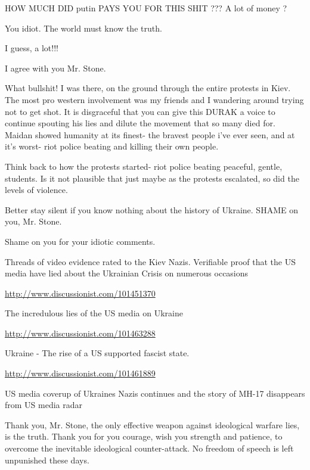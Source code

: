 \begin{itemize}

HOW MUCH DID putin PAYS YOU FOR THIS SHIT ??? A lot of money ?

\begin{itemize} %
You idiot. The world must know the truth.

I guess, a lot!!!
\end{itemize} %

I agree with you Mr. Stone.


What bullshit! I was there, on the ground through the entire protests in Kiev.
The most pro western involvement was my friends and I wandering around trying
not to get shot. It is disgraceful that you can give this DURAK a voice to
continue spouting his lies and dilute the movement that so many died for.
Maidan showed humanity at its finest- the bravest people i've ever seen, and at
it's worst- riot police beating and killing their own people.

Think back to how the protests started- riot police beating peaceful, gentle,
students. Is it not plausible that just maybe as the protests escalated, so did
the levels of violence.


Better stay silent if you know nothing about the history of Ukraine. SHAME on you, Mr. Stone.

Shame on you for your idiotic comments.


Threads of video evidence rated to the Kiev Nazis. Verifiable proof that the US
media have lied about the Ukrainian Crisis on numerous occasions

\url{http://www.discussionist.com/101451370}

The incredulous lies of the US media on Ukraine

\url{http://www.discussionist.com/101463288}

Ukraine - The rise of a US supported fascist state.

\url{http://www.discussionist.com/101461889}

US media coverup of Ukraines Nazis continues and the story of MH-17 disappears
from US media radar


Thank you, Mr. Stone, the only effective weapon against ideological warfare
lies, is the truth. Thank you for you courage, wish you strength and patience,
to overcome the inevitable ideological counter-attack. No freedom of speech is
left unpunished these days.



\end{itemize}
